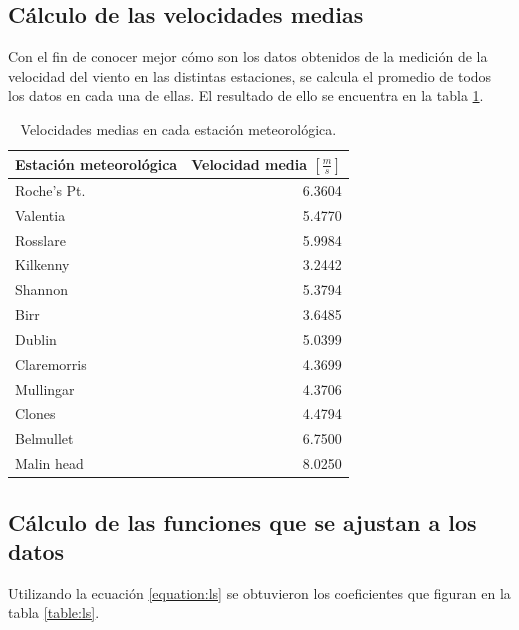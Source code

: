 \documentclass[journal, monochrome]{IEEEtran}
\begin{document}
\subsection{Cálculo de las velocidades medias}
\par
Con el fin de conocer mejor cómo son los datos obtenidos de la medición de la velocidad del viento en las distintas estaciones, se calcula el promedio de todos los datos en cada una de ellas. El resultado de ello se encuentra en la tabla \ref{table:speed}.

\begin{table}
	\begin{center}
		\begin{tabular}{l|r}
			Estación meteorológica & Velocidad media $[\frac{m}{s}]$ \\
			\hline
			Roche's Pt. & 6.3604 \\ 
			Valentia & 5.4770 \\
			Rosslare & 5.9984 \\
			Kilkenny & 3.2442 \\
			Shannon & 5.3794 \\
			Birr & 3.6485 \\
			Dublin & 5.0399 \\
			Claremorris & 4.3699 \\
			Mullingar & 4.3706 \\
			Clones & 4.4794 \\
			Belmullet & 6.7500 \\
			Malin head & 8.0250 \\
		\end{tabular}
		\caption{Velocidades medias en cada estación meteorológica.}
		\label{table:speed}
	\end{center}
\end{table}

\vspace{0.5cm}
\subsection{Cálculo de las funciones que se ajustan a los datos}
\par
Utilizando la ecuación \ref{equation:ls} se obtuvieron los coeficientes que figuran en la tabla \ref{table:ls}.
\end{document}
